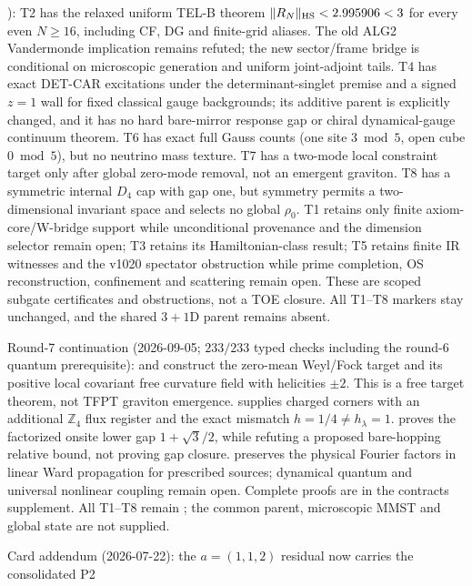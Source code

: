 \documentclass[11pt,a4paper]{article}
\newcommand{\Z}{\mathbb{Z}}
\begin{document}
):
T2 has the relaxed uniform TEL-B theorem $\|R_N\|_{\rm HS}<2.995906<3$
for every even $N\ge16$, including CF, DG and finite-grid aliases. The old
ALG2 Vandermonde implication remains refuted; the new sector/frame bridge
is conditional on microscopic generation and uniform joint-adjoint tails.
T4 has exact DET-CAR excitations under the determinant-singlet premise and
a signed $z=1$ wall for fixed classical gauge backgrounds; its additive
parent is explicitly changed, and it has no hard bare-mirror response gap
or chiral dynamical-gauge continuum theorem. T6 has exact full Gauss counts
(one site $3\bmod5$, open cube $0\bmod5$), but no neutrino mass texture.
T7 has a two-mode local constraint target only after global zero-mode removal,
not an emergent graviton. T8 has a symmetric internal $D_4$ cap with gap one,
but symmetry permits a two-dimensional invariant space and selects no global
$\rho_0$. T1 retains only
finite axiom-core/W-bridge support while unconditional provenance and the dimension
selector remain open; T3 retains its Hamiltonian-class result; T5 retains finite IR
witnesses and the v1020 spectator obstruction while prime completion, OS reconstruction,
confinement and scattering remain open. These are scoped subgate certificates and
obstructions, not a TOE closure.  All T1--T8 markers stay unchanged, and the shared
$3{+}1$D parent remains absent.
\par\smallskip\noindent
Round-7 continuation (2026-09-05; $233/233$ typed checks including the
round-6 quantum prerequisite):
 and
 construct the zero-mean Weyl/Fock
target and its positive local covariant free curvature field with
helicities $\pm2$. This is a free target theorem, not TFPT graviton emergence.
 supplies charged corners with an
additional $\Z_4$ flux register and the exact mismatch $h=1/4\ne h_\lambda=1$.
 proves the factorized onsite lower gap
$1+\sqrt3/2$, while refuting a proposed bare-hopping relative bound, not
proving gap closure.  preserves the
physical Fourier factors in linear Ward propagation for prescribed sources;
dynamical quantum and universal nonlinear coupling remain open.
Complete proofs are in the contracts supplement. All T1--T8 remain \mO;
the common parent, microscopic MMST and global state are not supplied.
\par\smallskip
\noindent Card addendum (2026-07-22): the $a=(1,1,2)$ residual now carries the consolidated P2
\end{document}
